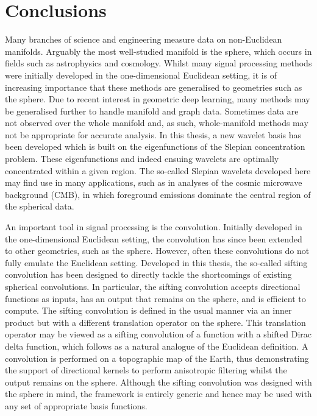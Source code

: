 \chapter{Conclusions}\label{sec:chapter6}

Many branches of science and engineering measure data on non-Euclidean manifolds.
Arguably the most well-studied manifold is the sphere, which occurs in fields such as astrophysics and cosmology.
Whilst many signal processing methods were initially developed in the one-dimensional Euclidean setting, it is of increasing importance that these methods are generalised to geometries such as the sphere.
Due to recent interest in geometric deep learning, many methods may be generalised further to handle manifold and graph data.
Sometimes data are not observed over the whole manifold and, as such, whole-manifold methods may not be appropriate for accurate analysis.
In this thesis, a new wavelet basis has been developed which is built on the eigenfunctions of the Slepian concentration problem.
These eigenfunctions and indeed ensuing wavelets are optimally concentrated within a given region.
The so-called Slepian wavelets developed here may find use in many applications, such as in analyses of the cosmic microwave background (CMB), in which foreground emissions dominate the central region of the spherical data.

An important tool in signal processing is the convolution.
Initially developed in the one-dimensional Euclidean setting, the convolution has since been extended to other geometries, such as the sphere.
However, often these convolutions do not fully emulate the Euclidean setting.
Developed in this thesis, the so-called sifting convolution has been designed to directly tackle the shortcomings of existing spherical convolutions.
In particular, the sifting convolution accepts directional functions as inputs, has an output that remains on the sphere, and is efficient to compute.
The sifting convolution is defined in the usual manner via an inner product but with a different translation operator on the sphere.
This translation operator may be viewed as a sifting convolution of a function with a shifted Dirac delta function, which follows as a natural analogue of the Euclidean definition.
A convolution is performed on a topographic map of the Earth, thus demonstrating the support of directional kernels to perform anisotropic filtering whilst the output remains on the sphere.
Although the sifting convolution was designed with the sphere in mind, the framework is entirely generic and hence may be used with any set of appropriate basis functions.

